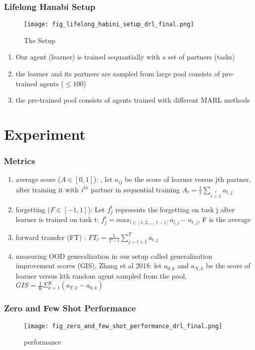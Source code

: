 \documentclass{njupre/njupre}
\begin{document}
\begin{frame}
    \frametitle{Lifelong Hanabi Setup}

    \begin{figure}
        \texttt{[image: fig\_lifelong\_habini\_setup\_drl\_final.png]}
        \caption[short]{The Setup}
    \end{figure}
    \begin{enumerate}
        \item Our agent (learner) is trained sequantially with a set of partners (tasks)
        \item the learner and its partners are sampled from large pool consists of pre-trained agents ($\le 100$)
        \item the pre-trained pool consists of agents trained with different MARL methods
    \end{enumerate}
\end{frame}

\section{Experiment}

\begin{frame}
    \frametitle{Metrics}

    \begin{enumerate}
        \item average score ($A\in[0,1]$): , let $a_{ij}$ be the score of learner versus jth partner, after training it with $i^{th}$ partner in sequential training $A_t=\frac{1}{t}\sum\limits_{i=1}\limits^{t}a_{t,j}$
        \item forgetting ($F\in [-1,1]$): Let $f_j^t$ represents the forgetting on task j after learner is trained on task t: $f_j^t=max_{l\in[1,2,\dots,t-1]}a_{l,j}-a_{t,j}$, F is the average
        \item forward transfer (FT) : $FT_{t}=\frac{1}{T-t}\sum_{j=t+1}^Ta_{t,j}$
        \item measuring OOD generalization in our setup called generalization improvement scores (GIS), Zhang et al 2018: let $a_{0,k}$ and $a_{N,k}$ be the score of learner versus kth random agent sampled from the pool,$GIS = \frac{1}{K}\Sigma_{k=1}^K(a_{T,k}-a_{0,k})$
    \end{enumerate}
\end{frame}

\begin{frame}
    \frametitle{Zero and Few Shot Performance}
    \begin{figure}
        \texttt{[image: fig\_zero\_and\_few\_shot\_performance\_drl\_final.png]}
        \caption[short]{performance}
    \end{figure}

\end{frame}
\end{document}
